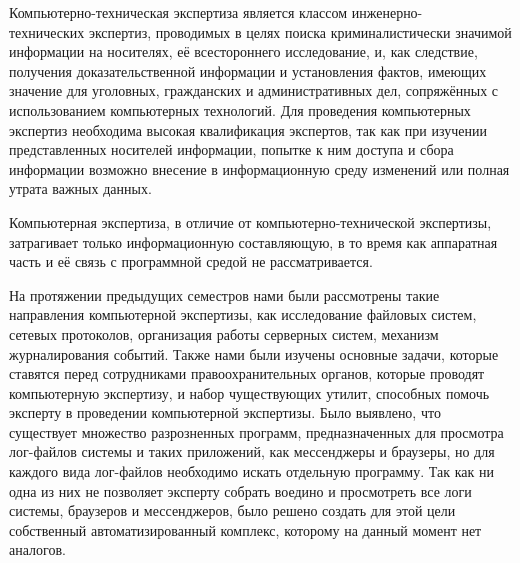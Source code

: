 Компьютерно-техническая экспертиза является классом инженерно-\\технических экспертиз, проводимых в целях поиска криминалистически значимой информации на носителях, её всестороннего исследование, и, как следствие, получения доказательственной информации и установления фактов, имеющих значение для уголовных, гражданских и административных дел, сопряжённых с использованием компьютерных технологий. Для проведения компьютерных экспертиз необходима высокая квалификация экспертов, так как при изучении представленных носителей информации, попытке к ним доступа и сбора информации возможно внесение в информационную среду изменений или полная утрата важных данных.

Компьютерная экспертиза, в отличие от компьютерно-технической экспертизы, затрагивает только информационную составляющую, в то время как аппаратная часть и её связь с программной средой не рассматривается.

На протяжении предыдущих семестров нами были рассмотрены такие направления компьютерной экспертизы, как исследование файловых систем, сетевых протоколов, организация работы серверных систем, механизм журналирования событий. Также нами были изучены основные задачи, которые ставятся перед сотрудниками правоохранительных органов, которые проводят компьютерную экспертизу, и набор чуществующих утилит, способных помочь эксперту в проведении компьютерной экспертизы. Было выявлено, что существует множество разрозненных программ, предназначенных для просмотра лог-файлов системы и таких приложений, как мессенджеры и браузеры, но для каждого вида лог-файлов необходимо искать отдельную программу. Так как ни одна из них не позволяет эксперту собрать воедино и просмотреть все логи системы, браузеров и мессенджеров, было решено создать для этой цели собственный автоматизированный комплекс, которому на данный момент нет аналогов.
